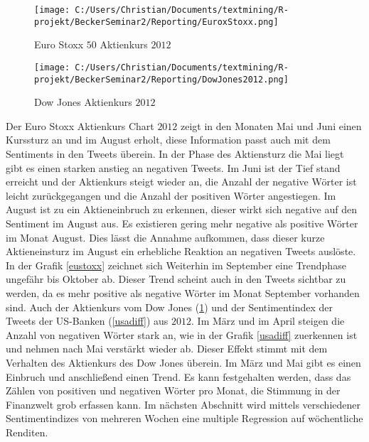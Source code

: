  \begin{figure}[H]
 \begin{minipage}[b]{.4\linewidth} %
 	\texttt{[image: C:/Users/Christian/Documents/textmining/R-projekt/BeckerSeminar2/Reporting/EuroxStoxx.png]}
 	\caption{Euro Stoxx $50$ Aktienkurs $2012$} \label{eustoxx}
 \end{minipage}
 \hspace{.1\linewidth}%
 \begin{minipage}[b]{.4\linewidth} %
 	\texttt{[image: C:/Users/Christian/Documents/textmining/R-projekt/BeckerSeminar2/Reporting/DowJones2012.png]}
 	\caption{Dow Jones Aktienkurs $2012$}\label{dowjones}
 \end{minipage}
\end{figure}
Der Euro Stoxx Aktienkurs Chart $2012$ zeigt in den Monaten Mai und Juni einen Kurssturz an und im August erholt, diese Information passt auch mit dem Sentiments in den Tweets überein. In der Phase des Aktiensturz  die Mai liegt gibt es einen starken anstieg an negativen Tweets. Im Juni ist der Tief stand erreicht und der Aktienkurs steigt wieder an, die Anzahl der negative Wörter ist leicht zurückgegangen und die Anzahl der positiven Wörter angestiegen. Im August ist zu ein Aktieneinbruch zu erkennen, dieser wirkt sich negative auf den Sentiment im August aus. Es existieren gering mehr negative als positive Wörter im Monat August. Dies lässt die Annahme aufkommen, dass dieser kurze Aktieneinsturz im August ein erhebliche Reaktion an negativen Tweets auslöste. In der Grafik \ref{eustoxx} zeichnet sich Weiterhin im September eine Trendphase ungefähr bis Oktober ab. Dieser Trend scheint auch in den Tweets sichtbar zu werden, da es mehr positive als negative Wörter im Monat September vorhanden sind. Auch der Aktienkurs vom Dow Jones (\ref{dowjones}) und der Sentimentindex der Tweets der US-Banken (\ref{usadiff}) aus $2012$. Im März und im April steigen die Anzahl von negativen Wörter stark an, wie in der Grafik \ref{usadiff} zuerkennen ist und nehmen nach Mai verstärkt wieder ab. Dieser Effekt stimmt mit dem Verhalten des Aktienkurs des Dow Jones überein. Im März und Mai gibt es einen Einbruch und anschließend einen Trend. Es kann festgehalten werden, dass das Zählen von positiven und negativen Wörter pro Monat, die Stimmung in der Finanzwelt grob erfassen kann. Im nächsten Abschnitt wird mittels verschiedener Sentimentindizes von mehreren Wochen eine multiple Regression auf wöchentliche Renditen.
